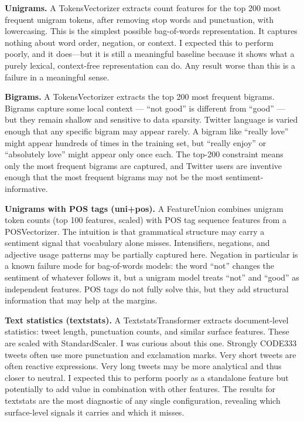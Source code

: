 \documentclass[12pt]{article}
\begin{document}
\textbf{Unigrams.} A TokensVectorizer extracts count features for the top 200 most frequent unigram tokens, after removing stop words and punctuation, with lowercasing. This is the simplest possible bag-of-words representation. It captures nothing about word order, negation, or context. I expected this to perform poorly, and it does—but it is still a meaningful baseline because it shows what a purely lexical, context-free representation can do. Any result worse than this is a failure in a meaningful sense.



\textbf{Bigrams.} A TokensVectorizer extracts the top 200 most frequent bigrams. Bigrams capture some local context --- ``not good'' is different from ``good'' --- but they remain shallow and sensitive to data sparsity. Twitter language is varied enough that any specific bigram may appear rarely. A bigram like ``really love'' might appear hundreds of times in the training set, but ``really enjoy'' or ``absolutely love'' might appear only once each. The top-200 constraint means only the most frequent bigrams are captured, and Twitter users are inventive enough that the most frequent bigrams may not be the most sentiment-informative.



\textbf{Unigrams with POS tags (uni+pos).} A FeatureUnion combines unigram token counts (top 100 features, scaled) with POS tag sequence features from a POSVectorizer. The intuition is that grammatical structure may carry a sentiment signal that vocabulary alone misses. Intensifiers, negations, and adjective usage patterns may be partially captured here. Negation in particular is a known failure mode for bag-of-words models: the word ``not'' changes the sentiment of whatever follows it, but a unigram model treats ``not'' and ``good'' as independent features. POS tags do not fully solve this, but they add structural information that may help at the margins.



\textbf{Text statistics (textstats).} A TextstatsTransformer extracts document-level statistics: tweet length, punctuation counts, and similar surface features. These are scaled with StandardScaler. I was curious about this one. Strongly CODE333 tweets often use more punctuation and exclamation marks. Very short tweets are often reactive expressions. Very long tweets may be more analytical and thus closer to neutral. I expected this to perform poorly as a standalone feature but potentially to add value in combination with other features. The results for textstats are the most diagnostic of any single configuration, revealing which surface-level signals it carries and which it misses.
\end{document}
